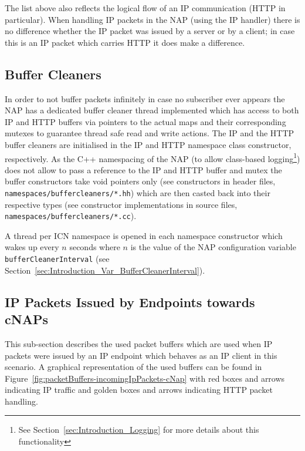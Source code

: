 \documentclass[a4paper,11pt,titlepage]{report}
\begin{document}
The list above also reflects the logical flow of an IP communication (\ac{HTTP} in particular). When handling IP packets in the \ac{NAP} (using the IP handler) there is no difference whether the IP packet was issued by a server or by a client; in case this is an IP packet which carries \ac{HTTP} it does make a difference.

\subsection{Buffer Cleaners}
In order to not buffer packets infinitely in case no subscriber ever appears the \ac{NAP} has a dedicated buffer cleaner thread implemented which has access to both IP and \ac{HTTP} buffers via pointers to the actual maps and their corresponding mutexes to guarantee thread safe read and write actions. The IP and the HTTP buffer cleaners are initialised in the IP and HTTP namespace class constructor, respectively. As the C++ namespacing of the NAP (to allow class-based logging\footnote{See Section~\ref{sec:Introduction_Logging} for more details about this functionality}) does not allow to pass a reference to the IP and HTTP buffer and mutex the buffer constructors take void pointers only (see constructors in header files, \texttt{namespaces/buffercleaners/*.hh}) which are then casted back into their respective types (see constructor implementations in source files, \texttt{namespaces/buffercleaners/*.cc}).

A thread per \ac{ICN} namespace is opened in each namespace constructor which wakes up every $n$ seconds where $n$ is the value of the \ac{NAP} configuration variable \texttt{bufferCleanerInterval} (see Section~\ref{sec:Introduction_Var_BufferCleanerInterval}).

\subsection[IP Packets Issued by Endpoints towards cNAPs]{IP Packets Issued by Endpoints towards \aclp{cNAP}}
This sub-section describes the used packet buffers which are used when IP packets were issued by an IP endpoint which behaves as an IP client in this scenario. A graphical representation of the used buffers can be found in Figure~\ref{fig:packetBuffers-incomingIpPackets-cNap} with red boxes and arrows indicating IP traffic and golden boxes and arrows indicating \ac{HTTP} packet handling.
\end{document}
